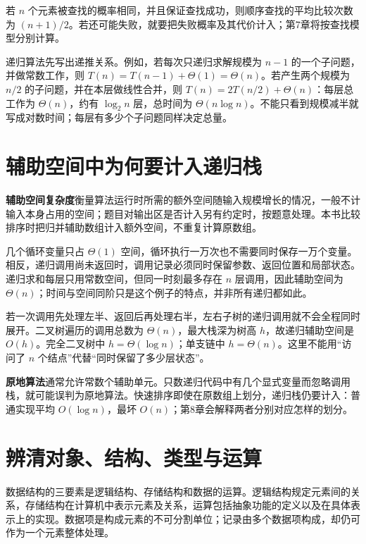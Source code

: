 若 \(n\) 个元素被查找的概率相同，并且保证查找成功，则顺序查找的平均比较次数为 \((n+1)/2\)。若还可能失败，就要把失败概率及其代价计入；第7章将按查找模型分别计算。

递归算法先写出递推关系。例如，若每次只递归求解规模为 \(n-1\) 的一个子问题，并做常数工作，则 \(T(n)=T(n-1)+\Theta(1)=\Theta(n)\)。若产生两个规模为 \(n/2\) 的子问题，并在本层做线性合并，则 \(T(n)=2T(n/2)+\Theta(n)\)：每层总工作为 \(\Theta(n)\)，约有 \(\log_2n\) 层，总时间为 \(\Theta(n\log n)\)。不能只看到规模减半就写成对数时间；每层有多少个子问题同样决定总量。

\section{辅助空间中为何要计入递归栈}\label{DS01-04}

\textbf{辅助空间复杂度}衡量算法运行时所需的额外空间随输入规模增长的情况，一般不计输入本身占用的空间；题目对输出区是否计入另有约定时，按题意处理。本书比较排序时把归并辅助数组计入额外空间，不重复计算原数组。

几个循环变量只占 \(\Theta(1)\) 空间，循环执行一万次也不需要同时保存一万个变量。相反，递归调用尚未返回时，调用记录必须同时保留参数、返回位置和局部状态。递归求和每层只用常数空间，但同一时刻最多存在 \(n\) 层调用，因此辅助空间为 \(\Theta(n)\)；时间与空间同阶只是这个例子的特点，并非所有递归都如此。

若一次调用先处理左半、返回后再处理右半，左右子树的递归调用就不会全程同时展开。二叉树遍历的调用总数为 \(\Theta(n)\)，最大栈深为树高 \(h\)，故递归辅助空间是 \(O(h)\)。完全二叉树中 \(h=\Theta(\log n)\)；单支链中 \(h=\Theta(n)\)。这里不能用``访问了 \(n\) 个结点''代替``同时保留了多少层状态''。

\textbf{原地算法}通常允许常数个辅助单元。只数递归代码中有几个显式变量而忽略调用栈，就可能误判为原地算法。快速排序即使在原数组上划分，递归栈仍要计入：普通实现平均 \(O(\log n)\)，最坏 \(O(n)\)；第8章会解释两者分别对应怎样的划分。

\section{辨清对象、结构、类型与运算}\label{DS01-map}

\begin{definition}[数据结构的三要素]

数据结构的三要素是逻辑结构、存储结构和数据的运算。逻辑结构规定元素间的关系，存储结构在计算机中表示元素及关系，运算包括抽象功能的定义以及在具体表示上的实现。数据项是构成元素的不可分割单位；记录由多个数据项构成，却仍可作为一个元素整体处理。

\end{definition}

